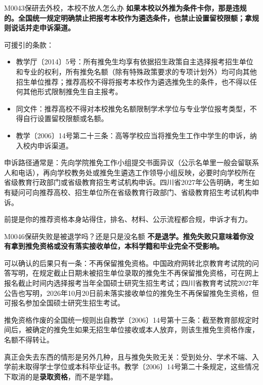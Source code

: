 \begin{qa}{M0043}{保研去外校，本校不放人怎么办}
\textbf{如果本校以外推为条件卡你，那是违规的。全国统一规定明确禁止把报考本校作为遴选条件，也禁止设置留校限额；拿规则说话并走申诉渠道。}

可援引的条款：

\begin{itemize}
  \item 教学厅〔2014〕5号：所有推免生均享有依据招生政策自主选择报考招生单位和专业的权利，所有推免名额（除有特殊政策要求的专项计划外）均可向其他招生单位推荐；推荐高校不得将报考本校作为遴选推免生的条件，也不得以任何其他形式限制推免生自主报考。
  \item 同文件：推荐高校不得对本校推免名额限制学术学位与专业学位报考类型，不得自行设置留校限额或名额。
  \item 教学〔2006〕14号第二十三条：高等学校应当将推免生工作中学生的申诉，纳入校内申诉渠道。
\end{itemize}

申诉路径通常是：先向学院推免工作小组提交书面异议（公示名单里一般会留联系人和电话），再向学校教务处或推免生遴选工作领导小组反映，必要时向学校所在省级教育行政部门或省级教育招生考试机构申诉。四川省2027年公告明确，考生如有疑问可向推荐高校、招生单位所在省级教育行政部门、省级教育招生考试机构申诉。

前提是你的推荐资格本身站得住，排名、材料、公示流程都合规，申诉才有力。
\end{qa}

\begin{qa}{M0046}{保研失败是被退学吗？还是只是没名额}
\textbf{不是退学。推免失败只意味着你没有拿到推免资格或没有落实接收单位，本科学籍和毕业完全不受影响。}

可以确认的后果只有一条：不再保留推免资格。中国政府网转北京教育考试院的问答写明，在规定截止日期未被招生单位录取的推免生不再保留推免资格，可在网上报名截止时间内选择报考当年全国硕士研究生招生考试；四川省教育考试院2027年公告也写明，2026年10月20日前未落实接收单位的推免生不再保留推免生资格，但可报名参加全国硕士研究生招生考试。

推免资格作废的全国统一规则出自教学〔2006〕14号第十三条：截至教育部规定时间后，被确定的推免生如果无招生单位接收或本人放弃，则该生推免生资格作废，名额不得转让。

真正会失去东西的情形是另外几种，且与推免失败无关：受到处分、学术不端、入学前未取得学士学位或本科毕业证书。教学〔2006〕14号第二十条规定，这些情况下取消的是\textbf{录取资格}，而不是学籍。
\end{qa}


